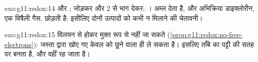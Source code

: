 \begin{solution}{exo:g11:redox:14}
 और ; जोड़कर
और 2 से भाग देकर: । अम्ल
  देता है, और अभिक्रिया डाइक्लोरीन, एक विषैली गैस, छोड़ती है:
इसीलिए दोनों उत्पादों को कभी न मिलाने की चेतावनी।
\end{solution}

\begin{solution}{exo:g11:redox:15}
 विलयन से होकर मुक्त रूप से नहीं जा सकते
(\cref{prop:g11:redox:no-free-electrons}): जस्ता  द्वारा खोए गए 
केवल  को छूने वाला   ही ले सकता है। इसलिए ताँबे का
 पट्टी की सतह पर बनता है, और वहीं रह जाता है।
\end{solution}

